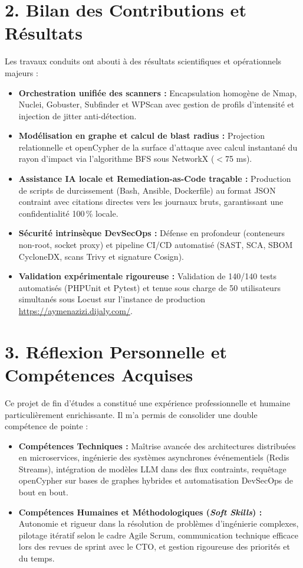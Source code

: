 \section*{2. Bilan des Contributions et R\'esultats}
\par Les travaux conduits ont abouti \`a des r\'esultats scientifiques et op\'erationnels majeurs :
\begin{itemize}
    \item \textbf{Orchestration unifi\'ee des scanners :} Encapsulation homog\`ene de Nmap, Nuclei, Gobuster, Subfinder et WPScan avec gestion de profils d'intensit\'e et injection de jitter anti-d\'etection.
    \item \textbf{Mod\'elisation en graphe et calcul de blast radius :} Projection relationnelle et openCypher de la surface d'attaque avec calcul instantan\'e du rayon d'impact via l'algorithme BFS sous NetworkX ($<$75 ms).
    \item \textbf{Assistance IA locale et Remediation-as-Code tra\c{c}able :} Production de scripts de durcissement (Bash, Ansible, Dockerfile) au format JSON contraint avec citations directes vers les journaux bruts, garantissant une confidentialit\'e 100\,\% locale.
    \item \textbf{S\'ecurit\'e intrins\`eque DevSecOps :} D\'efense en profondeur (conteneurs non-root, socket proxy) et pipeline CI/CD automatis\'e (SAST, SCA, SBOM CycloneDX, scans Trivy et signature Cosign).
    \item \textbf{Validation exp\'erimentale rigoureuse :} Validation de 140/140 tests automatis\'es (PHPUnit et Pytest) et tenue sous charge de 50 utilisateurs simultan\'es sous Locust sur l'instance de production \url{https://aymenazizi.dijaly.com/}.
\end{itemize}

\section*{3. R\'eflexion Personnelle et Comp\'etences Acquises}
\par Ce projet de fin d'\'etudes a constitu\'e une exp\'erience professionnelle et humaine particuli\`erement enrichissante. Il m'a permis de consolider une double comp\'etence de pointe :
\begin{itemize}
    \item \textbf{Comp\'etences Techniques :} Ma\^itrise avanc\'ee des architectures distribu\'ees en microservices, ing\'enierie des syst\`emes asynchrones \'ev\'enementiels (Redis Streams), int\'egration de mod\`eles LLM dans des flux contraints, requ\^etage openCypher sur bases de graphes hybrides et automatisation DevSecOps de bout en bout.
    \item \textbf{Comp\'etences Humaines et M\'ethodologiques (\textit{Soft Skills}) :} Autonomie et rigueur dans la r\'esolution de probl\`emes d'ing\'enierie complexes, pilotage it\'eratif selon le cadre Agile Scrum, communication technique efficace lors des revues de sprint avec le CTO, et gestion rigoureuse des priorit\'es et du temps.
\end{itemize}

